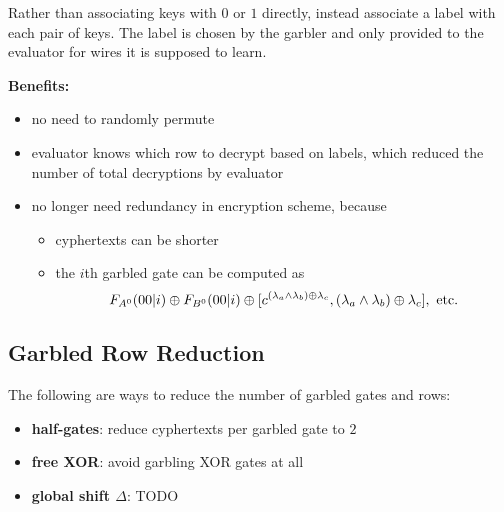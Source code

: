 Rather than associating keys with $0$ or $1$ directly, instead associate a label with each pair of keys. The label is chosen by the garbler and only provided to the evaluator for wires it is supposed to learn.


\noindent \textbf{Benefits:}
\begin{itemize}
    \item no need to randomly permute
    \item evaluator knows which row to decrypt based on labels, which reduced the number of total decryptions by evaluator
    \item no longer need redundancy in encryption scheme, because
    \begin{itemize}
        \item cyphertexts can be shorter
        \item the $i$th garbled gate can be computed as 
        \[
            F_{A^0}(00|i) \oplus F_{B^0}(00|i) \oplus [c^{(\lambda_a \land \lambda_b) \oplus \lambda_c}, (\lambda_a \land \lambda_b) \oplus \lambda_c], ~\text{etc.}
        \]
    \end{itemize}
\end{itemize}

\subsection{Garbled Row Reduction}

The following are ways to reduce the number of garbled gates and rows:
\begin{itemize}
    \item \textbf{half-gates}: reduce cyphertexts per garbled gate to $2$
    \item \textbf{free XOR}: avoid garbling XOR gates at all
    \item \textbf{global shift $\Delta$}: TODO
\end{itemize}